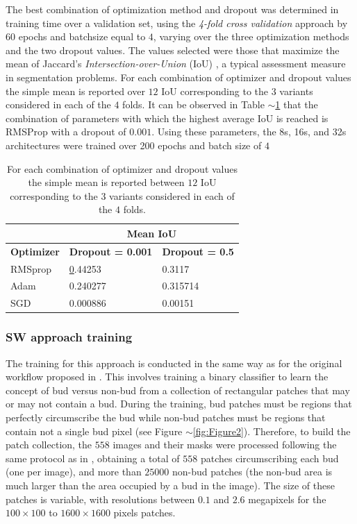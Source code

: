 \documentclass[a4paper,authoryear,review]{elsarticle}
\begin{document}
	The best combination of optimization method and dropout was determined in training time over a validation set, using the \emph{4-fold cross validation} approach by 60 epochs and batchsize equal to $4$, varying over the three optimization methods and the two dropout values. The values selected were those that maximize the mean of Jaccard's \emph{Intersection-over-Union} (IoU) \citep{jaccard1912distribution}, a typical assessment measure in segmentation problems. For each combination of optimizer and dropout values the simple mean is reported over $12$ IoU corresponding to the $3$ variants considered in each of the $4$ folds. It can be observed in Table $\sim$\ref{tab:Table2} that the combination of parameters with which the highest average IoU is reached is RMSProp with a dropout of $0.001$. Using these parameters, the 8s, 16s, and 32s architectures were trained over 200 epochs and batch size of $4$
	
	\begin{table}[]
		\centering
		\begin{tabular}{lll}
			\hline
			\multicolumn{1}{|l|}{} & \multicolumn{2}{c|}{\textbf{Mean IoU}} \\ \hline
			\multicolumn{1}{|c|}{\textbf{Optimizer}} & \multicolumn{1}{c|}{\textbf{Dropout = 0.001}} & \multicolumn{1}{c|}{\textbf{Dropout = 0.5}} \\ \hline
			RMSprop & {\ul 0.44253} & 0.3117 \\
			Adam & 0.240277 & 0.315714 \\
			SGD & 0.000886 & 0.00151 \\ \hline
		\end{tabular}%
		\caption{
			For each combination of optimizer and dropout values the simple mean is reported between $12$ IoU corresponding to the $3$ variants considered in each of the $4$ folds.
		}
		\label{tab:Table2}
	\end{table}
	
	
	\subsubsection{SW approach training}
	\label{sec:swtrain}
	
	The training for this approach is conducted in the same way as for the original workflow proposed in \citet{perez2017image}. This involves training a binary classifier to learn the concept of bud versus non-bud from a collection of rectangular patches that may or may not contain a bud. During the training, bud patches must be regions that perfectly circumscribe the bud while non-bud patches must be regions that contain not a single bud pixel (see Figure $\sim$\ref{fig:Figure2}). Therefore, to build the patch collection, the $558$ images and their masks were processed following the same protocol as in \citet{perez2017image}, obtaining a total of  $558$ patches circumscribing each bud (one per image), and more than $25000$ non-bud patches (the non-bud area is much larger than the area occupied by a bud in the image). The size of these patches is variable, with resolutions between $0.1$ and $2.6$ megapixels  for the  $100 \times 100$ to $1600 \times 1600$ pixels patches.
	
\end{document}
